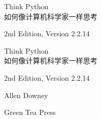 \documentclass[10pt,b5paper]{ctexbook} %
\newcommand{\theversion}{2nd Edition, Version 2.2.14}
\newcommand{\thedate}{}
\begin{document}
\begin{latexonly}

\renewcommand{\blankpage}{\thispagestyle{empty} \quad \newpage}



\thispagestyle{empty}

\begin{flushright}
\vspace*{2.0in}

\begin{spacing}{3}
{\huge Think Python}\\
{\Large 如何像计算机科学家一样思考}
\end{spacing}

\vspace{0.25in}

\theversion

\thedate

\vfill

\end{flushright}


\blankpage
\blankpage

\pagebreak
\thispagestyle{empty}

\begin{flushright}
\vspace*{2.0in}

\begin{spacing}{3}
{\huge Think Python}\\
{\Large 如何像计算机科学家一样思考}
\end{spacing}

\vspace{0.25in}

\theversion

\thedate

\vspace{1in}


{\Large
Allen Downey\\
}


\vspace{0.5in}

{\Large Green Tea Press}


\end{flushright}
\end{latexonly}
\end{document}
